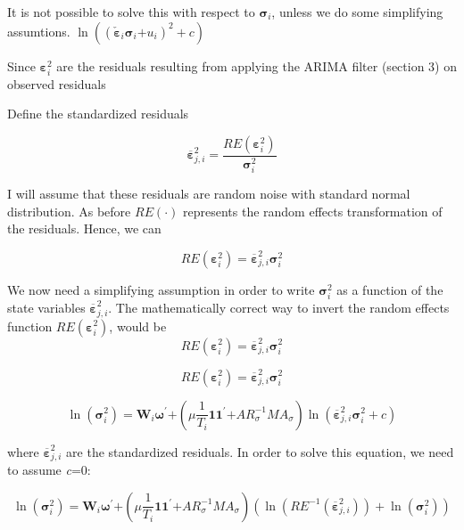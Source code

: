 \documentclass{article}
\begin{document}
It is not possible to solve this with respect to
$\mathbf{\sigma}_{i}$, unless we do some simplifying assumtions.
$\ln\left( \left( {\check{\mathbf{\varepsilon}}}_{i}\mathbf{\sigma}_{i}\mathbf{+}u_{i} \right)^{2} + c \right)$

Since $\mathbf{\varepsilon}_{i}^{2}$ are the residuals resulting from
applying the ARIMA filter (section 3) on observed residuals

Define the standardized residuals

\[{\overline{\mathbf{\varepsilon}}}_{j,i}^{2} = \frac{RE\left( \mathbf{\varepsilon}_{i}^{2} \right)}{\mathbf{\sigma}_{i}^{2}}\]

I will assume that these residuals are random noise with standard normal
distribution. As before $RE\left( \mathbf{\cdot} \right)$ represents
the random effects transformation of the residuals. Hence, we can

\[RE\left( \mathbf{\varepsilon}_{i}^{2} \right) = {\overline{\mathbf{\varepsilon}}}_{j,i}^{2}\mathbf{\sigma}_{i}^{2}\]

We now need a simplifying assumption in order to write
$\mathbf{\sigma}_{i}^{2}$ as a function of the state variables
${\overline{\mathbf{\varepsilon}}}_{j,i}^{2}$. The mathematically
correct way to invert the random effects function
$RE\left( \mathbf{\varepsilon}_{i}^{2} \right)$, would be $
$\[RE\left( \mathbf{\varepsilon}_{i}^{2} \right) = {\overline{\mathbf{\varepsilon}}}_{j,i}^{2}\mathbf{\sigma}_{i}^{2}\]

\[RE\left( \mathbf{\varepsilon}_{i}^{2} \right) = {\overline{\mathbf{\varepsilon}}}_{j,i}^{2}\mathbf{\sigma}_{i}^{2}\]

\[\ln\left( \mathbf{\sigma}_{i}^{2} \right) = \mathbf{W}_{i}\mathbf{\omega}^{\mathbf{'}}\mathbf{+}\left( \mu\frac{1}{T_{i}}\mathbf{1}\mathbf{1}^{\mathbf{'}}\mathbf{+}{AR}_{\sigma}^{- 1}MA_{\sigma} \right)\ln\left( {\overline{\mathbf{\varepsilon}}}_{j,i}^{2}\mathbf{\sigma}_{i}^{2} + c \right)\]

where ${\overline{\mathbf{\varepsilon}}}_{j,i}^{2}$ are the
standardized residuals. In order to solve this equation, we need to
assume \emph{c}=0:

\[\ln\left( \mathbf{\sigma}_{i}^{2} \right) = \mathbf{W}_{i}\mathbf{\omega}^{\mathbf{'}}\mathbf{+}\left( \mu\frac{1}{T_{i}}\mathbf{1}\mathbf{1}^{\mathbf{'}}\mathbf{+}{AR}_{\sigma}^{- 1}MA_{\sigma} \right)\left( \ln\left( {RE}^{- 1}\left( {\overline{\mathbf{\varepsilon}}}_{j,i}^{2} \right) \right) + \ln\left( \mathbf{\sigma}_{i}^{2} \right) \right)\]
\end{document}
